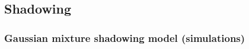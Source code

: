 \documentclass[lettersize,journal]{IEEEtran}
\begin{document}
  \subsection{Shadowing}




\subsubsection{Gaussian mixture shadowing model (simulations)}
\label{sec:guassianmixture}
\end{document}
